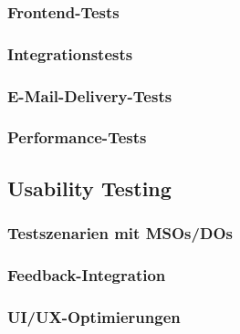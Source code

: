 \documentclass[11pt,a4paper]{article}
\begin{document}
\subsubsection{Frontend-Tests}

\subsubsection{Integrationstests}

\subsubsection{E-Mail-Delivery-Tests}

\subsubsection{Performance-Tests}

\subsection{Usability Testing}

\subsubsection{Testszenarien mit MSOs/DOs}

\subsubsection{Feedback-Integration}

\subsubsection{UI/UX-Optimierungen}
\end{document}

